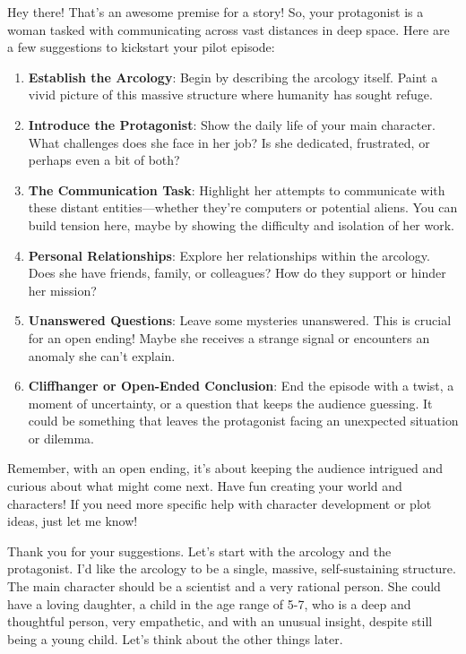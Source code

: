 \begin{aquote}
    Hey there! That's an awesome premise for a story! So, your protagonist is a woman tasked with communicating across vast distances in deep space. Here are a few suggestions to kickstart your pilot episode:
    \begin{enumerate}
        \item \textbf{Establish the Arcology}: Begin by describing the arcology itself. Paint a vivid picture of this massive structure where humanity has sought refuge.
        \item \textbf{Introduce the Protagonist}: Show the daily life of your main character. What challenges does she face in her job? Is she dedicated, frustrated, or perhaps even a bit of both?
        \item \textbf{The Communication Task}: Highlight her attempts to communicate with these distant entities—whether they're computers or potential aliens. You can build tension here, maybe by showing the difficulty and isolation of her work.
        \item \textbf{Personal Relationships}: Explore her relationships within the arcology. Does she have friends, family, or colleagues? How do they support or hinder her mission?
        \item \textbf{Unanswered Questions}: Leave some mysteries unanswered. This is crucial for an open ending! Maybe she receives a strange signal or encounters an anomaly she can't explain.
        \item \textbf{Cliffhanger or Open-Ended Conclusion}: End the episode with a twist, a moment of uncertainty, or a question that keeps the audience guessing. It could be something that leaves the protagonist facing an unexpected situation or dilemma.
    \end{enumerate}

    Remember, with an open ending, it's about keeping the audience intrigued and curious about what might come next. Have fun creating your world and characters! If you need more specific help with character development or plot ideas, just let me know!
\end{aquote}

\begin{qquote}
    Thank you for your suggestions. Let's start with the arcology and the protagonist. I'd like the arcology to be a single, massive, self-sustaining structure. The main character should be a scientist and a very rational person. She could have a loving daughter, a child in the age range of 5-7, who is a deep and thoughtful person, very empathetic, and with an unusual insight, despite still being a young child. Let's think about the other things later. 
\end{qquote}

